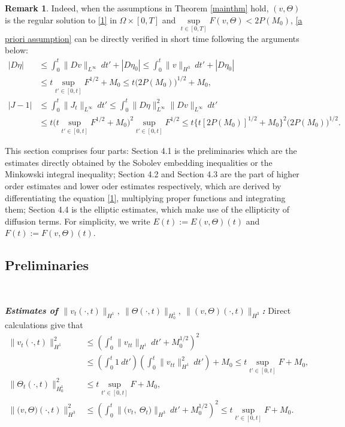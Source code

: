 \documentclass[12pt,a4paper]{amsart}
\numberwithin{equation}{section}
\theoremstyle{plain}
\theoremstyle{definition}
\newtheorem{Rem}[Thm]{Remark}
\begin{document}
\begin{Rem}\label{rem-assumption}
	Indeed, when the assumptions in Theorem \ref{mainthm} hold, $(v,\Theta)$ is the regular solution to \eqref{1} in $\Omega \times[0,T]$ and $\sup\limits_{t\in[0,T]} F(v,\Theta)<2P(M_0)$,
	\eqref{a priori assumption} can be directly verified in short time following the arguments below:
	\begin{equation}
	\begin{aligned}
	|D\eta| &\leq \int_{0}^{t} \|Dv\|_{L^{\infty}}\ dt' + |D\eta_0|\leq \int_{0}^{t} \|v\|_{H^3}\ dt' + |D\eta_0|\\
	&\leq t \sup\limits_{t'\in[0,t]}F^{1/2} +M_0\leq t \Big(2P(M_0)\Big)^{1/2}+M_0,\\
	|J-1|   &\leq \int_{0}^{t} \|J_t\|_{L^{\infty}}\ dt'\leq \int_{0}^{t} \|D\eta\|_{L^{\infty}}^2\|Dv\|_{L^{\infty}} \ dt' \\
	&\leq  t \Big(t \sup\limits_{t'\in[0,t]}F^{1/2} +M_0\Big)^2 \sup\limits_{t'\in[0,t]}F^{1/2} \leq t \Big\{t[2P(M_0)]^{1/2} +M_0\Big\}^2 \Big(2P(M_0)\Big)^{1/2}.
	\end{aligned}
	\end{equation}
\end{Rem}

This section comprises four parts: Section 4.1 is the preliminaries which are the estimates directly obtained by the Sobolev embedding inequalities or the Minkowski integral inequality; Section 4.2 and Section 4.3 are the part of higher order estimates and lower oder estimates respectively, which are derived by differentiating the equation \eqref{1}, multiplying proper functions and integrating them; Section 4.4 is the elliptic estimates, which make use of the ellipticity of diffusion terms. 
For simplicity, we write  $E(t):=E(v,\Theta)(t)$ and $F(t):=F(v,\Theta)(t)$.


\vspace{0.3cm}

\subsection{Preliminaries}~
\vspace{0.3cm}

\textsl{\textbf{Estimates of $\|v_t(\cdot,t)\|_{H^1},~\|\Theta(\cdot,t)\|_{H_0^1},~ 
		\|(v, \Theta)(\cdot,t)\|_{H^3}$:}}
Direct calculations give that
\begin{equation}
\label{direct}
\begin{aligned}
\|v_t(\cdot,t)\|_{H^1}^2
&\leq \left(\int_{0}^{t}\|v_{tt}\|_{H^1}\ dt'+M_0^{1/2}\right)^2\\
&\leq \left( \int_{0}^{t} 1 \ dt'  \right)
\left(\int_{0}^{t}\|v_{tt}\|_{H^1}^2\ dt'\right)+M_0
\leq t \sup\limits_{t'\in[0,t]}F+M_0,\\
\|\Theta_t(\cdot,t)\|_{H_0^1}^2
&\leq t\sup\limits_{t'\in[0,t]}F+M_0,\\
\|\Big(v,\Theta\Big)(\cdot,t)\|_{H^3}^2
&\leq \left( \int_{0}^{t}\|\Big(v_t,\ \Theta_t\Big)\|_{H^3}\ dt'+M_0^{1/2}\right)^2
\leq t \sup\limits_{t'\in[0,t]}F+M_0.
\end{aligned}
\end{equation}
\end{document}
